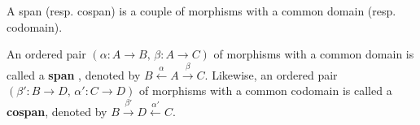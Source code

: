 A span (resp. cospan) is a couple of morphisms with a common domain (resp. codomain).
\begin{definition}
An ordered pair \((\alpha : A  \mathop{\to} B,\, \beta : A  \mathop{\to} C)\) of morphisms with a common domain is called a \textbf{span} \cite{lowe2010graph}, denoted by
\(
B \overset{\alpha}{\leftarrow} A \overset{\beta}{\rightarrow} C
\). 
Likewise, an ordered pair \((\beta' : B  \mathop{\to} D,\, \alpha' : C  \mathop{\to} D)\) of morphisms with a common codomain is called a \textbf{cospan}, denoted by
\(
B \overset{\beta'}{\rightarrow} D \overset{\alpha'}{\leftarrow} C
\). 
\end{definition}
